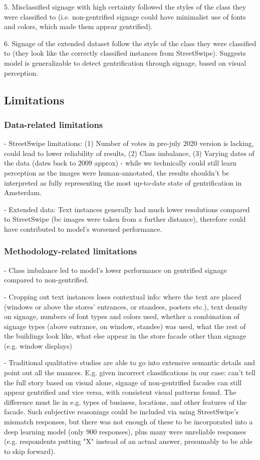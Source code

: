 5. Misclassified signage with high certainty followed the styles of the class they were classified to (i.e. non-gentrified signage could have minimalist use of fonts and colors, which made them appear gentrified). 

6. Signage of the extended dataset follow the style of the class they were classified to (they look like the correctly classified instances from StreetSwipe). Suggests model is generalizable to detect gentrification through signage, based on visual perception.

\subsection{Limitations}
\subsubsection{Data-related limitations}

- StreetSwipe limitations: (1) Number of votes in pre-july 2020 version is lacking, could lead to lower reliability of results, (2) Class imbalance, (3) Varying dates of the data (dates back to 2009 approx) - while we technically could still learn perception as the images were human-annotated, the results shouldn't be interpreted as fully representing the most up-to-date state of gentrification in Amsterdam.

- Extended data: Text instances generally had much lower resolutions compared to StreetSwipe (bc images were taken from a further distance), therefore could have contributed to model's worsened performance.

\subsubsection{Methodology-related limitations}

- Class imbalance led to model's lower performance on gentrified signage compared to non-gentrified.

- Cropping out text instances loses contextual info: where the text are placed (windows or above the stores' entrances, or standees, posters etc.), text density on signage, numbers of font types and colors used, whether a combination of signage types (above entrance, on window, standee) was used, what the rest of the buildings look like, what else appear in the store facade other than signage (e.g. window displays)

- Traditional qualitative studies are able to go into extensive semantic details and point out all the nuances. E.g. given incorrect classifications in our case: can't tell the full story based on visual alone, signage of non-gentrified facades can still appear gentrified and vice versa, with consistent visual patterns found. The difference must lie in e.g. types of business, locations, and other features of the facade. Such subjective reasonings could be included via using StreetSwipe's mismatch responses, but there was not enough of these to be incorporated into a deep learning model (only 900 responses), plus many were unreliable responses (e.g. respondents putting "X" instead of an actual answer, presumably to be able to skip forward).
